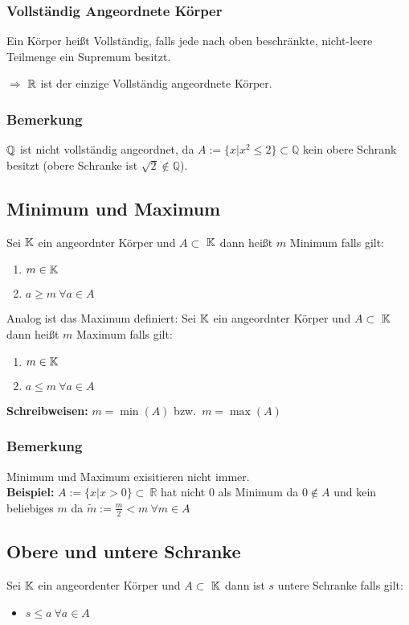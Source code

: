 \subsubsection{Vollständig Angeordnete Körper}
Ein Körper heißt Vollständig, falls jede nach oben beschränkte, nicht-leere
Teilmenge ein Supremum besitzt.

$\Rightarrow$ $\mathbb{R}$ ist der einzige Vollständig angeordnete Körper.

\subsubsection{Bemerkung} $\mathbb{Q}$ ist nicht vollständig angeordnet, da
$A := \{x | x^2 \leq 2\} \subset \mathbb{Q}$ kein obere Schrank besitzt
(obere Schranke ist $\sqrt{2} \notin \mathbb{Q}$).


\subsection{Minimum und Maximum}
Sei $\mathbb{K}$ ein angeordnter Körper und $A \subset$ $\mathbb{K}$ dann heißt
$m$ Minimum falls gilt:
\begin{enumerate}
    \item $m \in \mathbb{K}$
    \item $a \geq m\ \forall a \in A$
\end{enumerate}
Analog ist das Maximum definiert:
Sei $\mathbb{K}$ ein angeordnter Körper und $A \subset$ $\mathbb{K}$ dann heißt
$m$ Maximum falls gilt:
\begin{enumerate}
    \item $m \in \mathbb{K}$
    \item $a \leq m\ \forall a \in A$
\end{enumerate}
\textbf{Schreibweisen:}
$m = \min{(A)}$ bzw.\ $m = \max{(A)}$\\
\subsubsection{Bemerkung}
Minimum und Maximum exisitieren nicht immer.\\
\textbf{Beispiel:} $A := \{x | x>0\}\subset\ \mathbb{R}$
hat nicht 0 als Minimum da $0 \notin A$ und kein beliebiges $m$ da $\tilde{m} := \frac{m}{2} < m\ \forall m \in A$

\subsection{Obere und untere Schranke}
Sei $\mathbb{K}$ ein angeordenter Körper und $A \subset$ $\mathbb{K}$ dann ist $s$ untere
Schranke falls gilt:
\begin{itemize}
    \item $s \leq a\ \forall a \in A$
\end{itemize}

